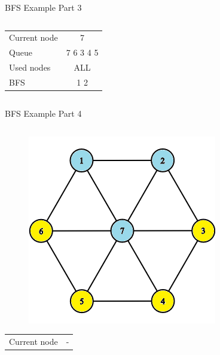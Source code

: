 \documentclass[aspectratio=169]{beamer}%
\begin{document}
\begin{frame}{BFS Example Part 3}
\begin{columns}
\begin{column}{0.32\textwidth}
\begin{figure}[!ht]
            \end{figure}
            \begin{table}[ht]
                \centering
                \begin{tabular}{l c}
                    Current node & 7\\
                    Queue & 7 6 3 4 5\\ 
                    Used nodes & ALL\\
                    BFS & 1 2
                \end{tabular}
            \end{table}
        \end{column}
    \end{columns}
\end{frame}

\begin{frame}{BFS Example Part 4}
    \begin{columns}
        \begin{column}{0.32\textwidth}
            \begin{figure}[!ht]
                \centering
                \includegraphics[width=0.9\linewidth]{bfs 10.png}
            \end{figure}
            \begin{table}[ht]
                \centering
                \begin{tabular}{l c}
                    Current node & -\\

\end{tabular}
\end{table}
\end{column}
\end{columns}
\end{frame}
\end{document}
